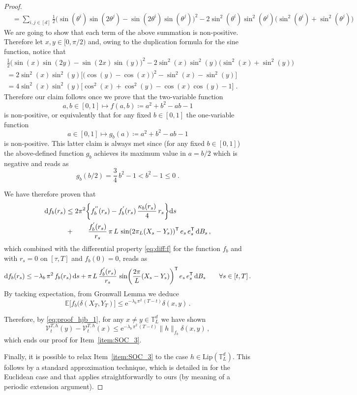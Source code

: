 \documentclass[final,12pt]{colt2023} %
\newcommand{\bes}{\begin{equation}}
\newcommand{\ees}{\end{equation}}
\newcommand{\De}{\mathrm{d}}
\newcommand{\rme}{\mathrm{e}}
\def\eqsp{\;}
\begin{document}
\begin{proof}
\begin{align}
&  = \sum_{i,j\in[d]}\frac{1}{2}\biggl(\sin(\theta^i) \sin( 2 \theta^j) - \sin(2 \theta^i) \sin(\theta^j)\biggr)^2 -2 \sin^2(\theta^i) \sin^2( \theta^j) \biggl(\sin^2(\theta^i) + \sin^2( \theta^j)\biggr)
\end{align}
We are going to show that each term of the above summation is non-positive. Therefore let $x,y\in [0,\pi/2)$ and, owing to the duplication formula for the sine function, notice that 
\begin{align}
     \frac{1}{2}\biggl(\sin(x) \sin( 2 y) - \sin(2 x) \sin(y)\biggr)^2 -2 \sin^2(x) \sin^2( y) \biggl(\sin^2(x) + \sin^2(y)\biggr)\\
    =2\sin^2(x)\sin^2(y)\biggl[\bigl(\cos(y)-\cos(x)\bigr)^2-\sin^2(x)-\sin^2(y)\biggr]\\
     =4\sin^2(x)\sin^2(y)\biggl[\cos^2(x)+\cos^2(y)-\cos(x)\cos(y)-1\biggr]\eqsp.
\end{align}
Therefore our claim follows once we prove that the two-variable function
\bes
a,b\in[0,1]\mapsto f(a,b)\coloneqq a^2+b^2-ab-1
\ees
is non-positive, or equivalently that for any fixed $b\in[0,1]$
the one-variable function 
\bes
a\in[0,1]\mapsto g_b(a)\coloneqq a^2+b^2-ab-1
\ees
is non-positive. This latter claim is always met since (for any fixed $b\in[0,1]$) the above-defined function $g_b$ achieves its maximum value in $a=b/2$ which is negative and reads as
\bes
g_b(b/2)=\frac{3}{4}\,b^2-1< b^2-1\leq 0\eqsp.
\ees

We have therefore proven that 
\bes
\begin{split}
    \De f_b(r_s)& \leq 2{\pi}^2\biggl\{f_b^{''}(r_s)
    -f_b^{'}(r_s)\,\frac{\kappa_b(r_s)}4\,r_s\biggr\}\De s\\
    & + \qquad \frac{f_b^{'}(r_s)}{r_s}\,{\pi\,L}\,\sin(2{\pi_L}(X_s-Y_s))^{{\sf  T}}\,e_s\,e_s^{{\sf  T}}\,\De B_s \, ,
\end{split}
\ees
which combined with the differential property \eqref{eq:diff:f} for the function $f_b$ and with $r_s=0$ on $[\tau,T]$ and $f_b(0)=0$, reads as
\bes
\De f_b(r_s)\leq -\lambda_b\,\pi^2\, f_b(r_s)\,\De s +\pi\,L\,\frac{f_b^{'}(r_s)}{r_s}\,\sin\biggl(\frac{2\pi}{L}(X_s-Y_s)\biggr)^{{\sf  T}}\,e_s\,e_s^{{\sf  T}}\,\De B_s\qquad\forall s\in[t,T]\,.
\ees
By tacking expectation, from Gronwall Lemma we deduce
 \[\mathbb{E}\bigl[f_b(\delta(X_T,Y_T)\bigr]\leq \rme^{-\lambda_b\,\pi^2\,(T-t)}\delta(x,y)\,.\]

Therefore, by \eqref{eq:proof_hjb_1}, for any $x\neq y\in \mathbb{T}_L^d$ we have shown 
 \[\mathcal{V}^{T,h}_t(y)-\mathcal{V}^{T,h}_t(x)\leq \rme^{-\lambda_b\,\pi^2\,(T-t)}\|h\|_{f_b} \delta(x,y)\,,\]
 which ends our proof for Item~\ref{item:SOC_3}.
 
Finally, it is possible to relax Item~\ref{item:SOC_3} to the case $h\in\mathrm{Lip}(\mathbb{T}_L^d)$. This follows by a standard approximation technique, which is detailed in \cite[Lemma 3.1]{conforti2022coupling} for the Euclidean case and that applies straightforwardly to ours (by meaning of a periodic extension argument).
\end{proof}
 
\end{document}
